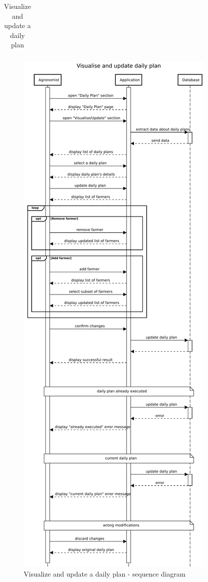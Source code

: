 \begin{table}[H]
\begin{tabular}[c]{|l|p{}|}
    	\hline %
        
    \end{tabular}
    \caption{\label{tab:daily_plan_section_access}Visualize and update a daily plan}
\end{table}

\begin{figure}[H]
    \centering
    \includegraphics[scale=0.45]{Images/Sequence diagrams/Agronomist - visualise and update daily plan.pdf}

    \caption{Visualize and update a daily plan - sequence diagram}
    \label{fig:fig:seq_diag_update_daily_plan}
\end{figure}

